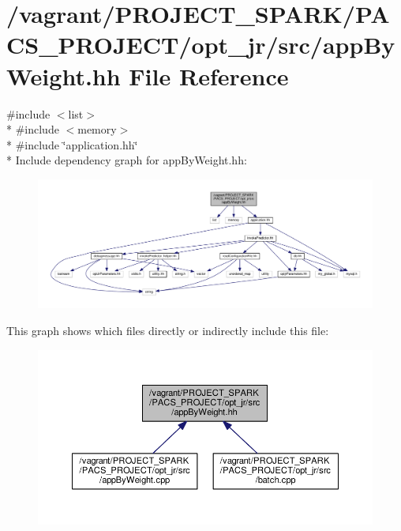 \hypertarget{appByWeight_8hh}{\section{/vagrant/\-P\-R\-O\-J\-E\-C\-T\-\_\-\-S\-P\-A\-R\-K/\-P\-A\-C\-S\-\_\-\-P\-R\-O\-J\-E\-C\-T/opt\-\_\-jr/src/app\-By\-Weight.hh File Reference}
\label{appByWeight_8hh}
}
{\ttfamily \#include $<$list$>$}\\*
{\ttfamily \#include $<$memory$>$}\\*
{\ttfamily \#include \char`\"{}application.\-hh\char`\"{}}\\*
Include dependency graph for app\-By\-Weight.\-hh\-:\nopagebreak
\begin{figure}[H]
\begin{center}
\leavevmode
\includegraphics[width=350pt]{appByWeight_8hh__incl}
\end{center}
\end{figure}
This graph shows which files directly or indirectly include this file\-:\nopagebreak
\begin{figure}[H]
\begin{center}
\leavevmode
\includegraphics[width=350pt]{appByWeight_8hh__dep__incl}
\end{center}
\end{figure}
